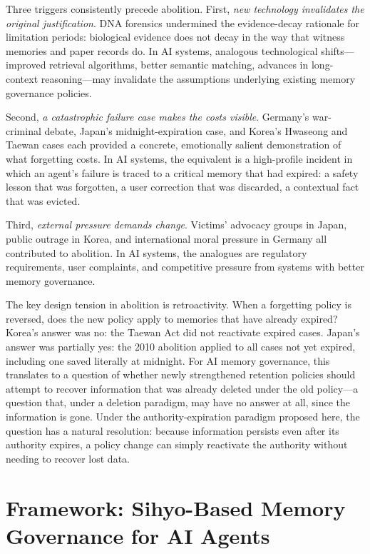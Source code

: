 \documentclass[12pt]{article}
\begin{document}
Three triggers consistently precede abolition. First, \emph{new technology invalidates the original justification}. DNA forensics undermined the evidence-decay rationale for limitation periods: biological evidence does not decay in the way that witness memories and paper records do. In AI systems, analogous technological shifts---improved retrieval algorithms, better semantic matching, advances in long-context reasoning---may invalidate the assumptions underlying existing memory governance policies.

Second, \emph{a catastrophic failure case makes the costs visible}. Germany's war-criminal debate, Japan's midnight-expiration case, and Korea's Hwaseong and Taewan cases each provided a concrete, emotionally salient demonstration of what forgetting costs. In AI systems, the equivalent is a high-profile incident in which an agent's failure is traced to a critical memory that had expired: a safety lesson that was forgotten, a user correction that was discarded, a contextual fact that was evicted.

Third, \emph{external pressure demands change}. Victims' advocacy groups in Japan, public outrage in Korea, and international moral pressure in Germany all contributed to abolition. In AI systems, the analogues are regulatory requirements, user complaints, and competitive pressure from systems with better memory governance.

The key design tension in abolition is retroactivity. When a forgetting policy is reversed, does the new policy apply to memories that have already expired? Korea's answer was no: the Taewan Act did not reactivate expired cases. Japan's answer was partially yes: the 2010 abolition applied to all cases not yet expired, including one saved literally at midnight. For AI memory governance, this translates to a question of whether newly strengthened retention policies should attempt to recover information that was already deleted under the old policy---a question that, under a deletion paradigm, may have no answer at all, since the information is gone. Under the authority-expiration paradigm proposed here, the question has a natural resolution: because information persists even after its authority expires, a policy change can simply reactivate the authority without needing to recover lost data.

\section{Framework: Sihyo-Based Memory Governance for AI Agents}
\label{sec:framework}
\end{document}
